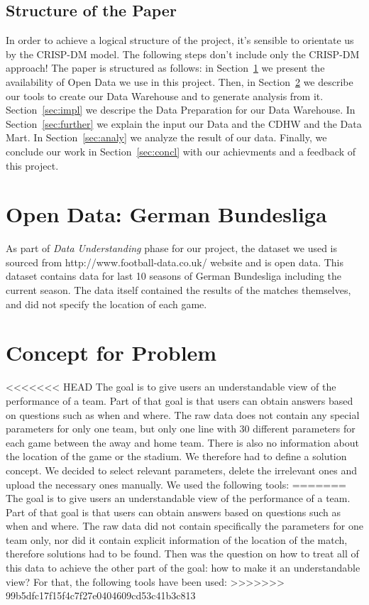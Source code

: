 \documentclass[11pt, journal]{IEEEtran}
\begin{document}
\subsection{Structure of the Paper} \label{subsec:struct}
In order to achieve a logical structure of the project, it’s sensible to orientate us by the CRISP-DM model. The following steps don't include only the CRISP-DM approach!
The paper is structured as follows: in Section~\ref{sec:dataunderstanding} we present the availability of Open Data we use in this project.
Then, in Section~\ref{sec:concept} we describe our tools to create our Data Warehouse and to generate analysis from it. Section~\ref{sec:impl} we descripe the Data Preparation for our Data Warehouse. In Section~\ref{sec:further} we explain the input our Data and the CDHW and the Data Mart.  In Section~\ref{sec:analy} we analyze the result of our data. Finally, we conclude our work in Section~\ref{sec:concl} with our achievments and a feedback of this project.


\section{Open Data: German Bundesliga } \label{sec:dataunderstanding}
As part of \emph{Data Understanding}  phase for our project, the dataset we used is sourced from http://www.football-data.co.uk/ website and is open data. This dataset contains data for last 10 seasons of German Bundesliga including the current season. The data itself contained the results of the matches themselves, and did not specify the location of each game.
\section{Concept for Problem} \label{sec:concept}
<<<<<<< HEAD
The goal is to give users an understandable view of the performance of a team. Part of that goal is that users can obtain answers based on questions such as when and where. The raw data does not contain any special parameters for only one team, but only one line with 30 different parameters for each game between the away and home team. There is also no information about the location of the game or the stadium. We therefore had to define a solution concept. We decided to select relevant parameters, delete the irrelevant ones and upload the necessary ones manually. We used the following tools:
=======
The goal is to give users an understandable view of the performance of a team. Part of that goal is that users can obtain answers based on questions such as when and where. The raw data did not contain specifically the parameters for one team only, nor did it contain explicit information of the location of the match, therefore solutions had to be found. Then was the question on how to treat all of this data to achieve the other part of the goal: how to make it an understandable view? For that, the following tools have been used:
>>>>>>> 99b5dfc17f15f4c7f27e0404609cd53c41b3c813
\end{document}
